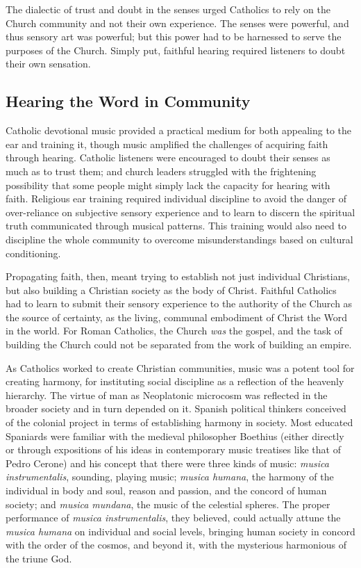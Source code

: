 The dialectic of trust and doubt in the senses urged Catholics to rely on the
Church community and not their own experience.
The senses were powerful, and thus sensory art was powerful; but this power had
to be harnessed to serve the purposes of the Church.
Simply put, faithful hearing required listeners to doubt their own sensation.


\subsection{Hearing the Word in Community}

Catholic devotional music provided a practical medium for both appealing to the
ear and training it, though music amplified the challenges of acquiring faith
through hearing.
Catholic listeners were encouraged to doubt their senses as much as to trust
them; and church leaders struggled with the frightening possibility that some
people might simply lack the capacity for hearing with faith.
Religious ear training required individual discipline to avoid the danger of
over-reliance on subjective sensory experience and to learn to discern the
spiritual truth communicated through musical patterns.
This training would also need to discipline the whole community to overcome
misunderstandings based on cultural conditioning.

Propagating faith, then, meant trying to establish not just individual
Christians, but also building a Christian society as the body of Christ.
Faithful Catholics had to learn to submit their sensory experience to the
authority of the Church as the source of certainty, as the living, communal
embodiment of Christ the Word in the world.
For Roman Catholics, the Church \emph{was} the gospel, and the task of building
the Church could not be separated from the work of building an empire.

As Catholics worked to create Christian communities, music was a potent tool for
creating harmony, for instituting social discipline as a reflection of the
heavenly hierarchy.%
    \Autocites{Baker:Harmony}{Irving:Colonial}{Illari:Polychoral}
The virtue of man as Neoplatonic microcosm was reflected in the broader society
and in turn depended on it.
Spanish political thinkers conceived of the colonial project in terms of
establishing harmony in society.%
    \Autocite[22--31]{Baker:Harmony}
Most educated Spaniards were familiar with the medieval philosopher Boethius
(either directly or through expositions of his ideas in contemporary music
treatises like that of Pedro Cerone) and his concept that there were three kinds
of music: \emph{musica instrumentalis}, sounding, playing music; \emph{musica
humana}, the harmony of the individual in body and soul, reason and passion, and
the concord of human society; and \emph{musica mundana}, the music of the
celestial spheres.%
    \Autocites
    [, ]{Cerone:Melopeo}
    [203--208]{Boethius:Musica}
The proper performance of \emph{musica instrumentalis}, they believed, could
actually attune the \emph{musica humana} on individual and social levels,
bringing human society in concord with the order of the cosmos, and beyond it,
with the mysterious harmonious of the triune God.

